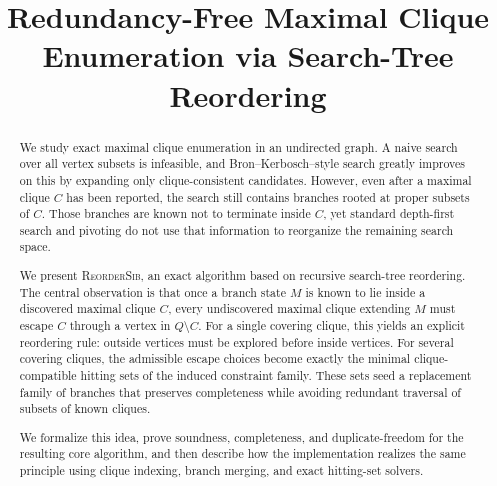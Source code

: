 \documentclass[sigconf, nonacm]{acmart}
\theoremstyle{definition}
\theoremstyle{remark}
\begin{document}
\title{Redundancy-Free Maximal Clique Enumeration via Search-Tree Reordering}

\begin{abstract}
We study exact maximal clique enumeration in an undirected graph.  A naive
search over all vertex subsets is infeasible, and Bron--Kerbosch--style search
greatly improves on this by expanding only clique-consistent candidates.
However, even after a maximal clique $C$ has been reported, the search still
contains branches rooted at proper subsets of $C$.  Those branches are known
not to terminate inside $C$, yet standard depth-first search and pivoting do
not use that information to reorganize the remaining search space.

We present \textsc{ReorderSib}, an exact algorithm based on recursive
search-tree reordering.  The central observation is that once a branch state
$M$ is known to lie inside a discovered maximal clique $C$, every undiscovered
maximal clique extending $M$ must escape $C$ through a vertex in $Q \setminus
C$.  For a single covering clique, this yields an explicit reordering rule:
outside vertices must be explored before inside vertices.  For several
covering cliques, the admissible escape choices become exactly the minimal
clique-compatible hitting sets of the induced constraint family.  These sets
seed a replacement family of branches that preserves completeness while
avoiding redundant traversal of subsets of known cliques.

We formalize this idea, prove soundness, completeness, and duplicate-freedom
for the resulting core algorithm, and then describe how the implementation
realizes the same principle using clique indexing, branch merging, and exact
hitting-set solvers.
\end{abstract}

\maketitle
\end{document}
